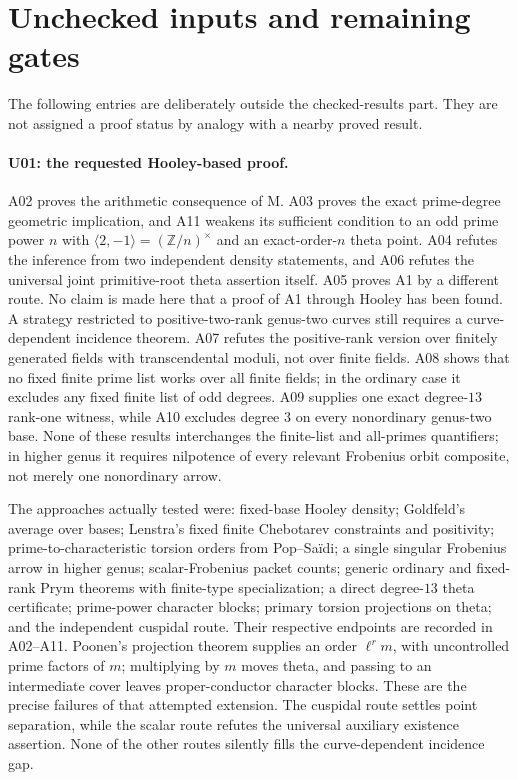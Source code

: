 \documentclass[11pt,a4paper]{article}
\begin{document}
\section{Unchecked inputs and remaining gates}
\label{sec:remaining}

The following entries are deliberately outside the checked-results
part. They are not assigned a proof status by analogy with a nearby
proved result.

\paragraph{U01: the requested Hooley-based proof.}
A02 proves the arithmetic consequence of M. A03 proves the exact
prime-degree geometric implication, and A11 weakens its sufficient
condition to an odd prime power $n$ with
$\langle2,-1\rangle=(\mathbb Z/n)^\times$ and an exact-order-$n$
theta point. A04 refutes the inference from
two independent density statements, and A06 refutes the universal
joint primitive-root theta assertion itself. A05 proves A1 by a
different route. No claim is made here that a proof of A1 through
Hooley has been found. A strategy restricted to positive-two-rank
genus-two curves still requires a curve-dependent incidence theorem.
A07 refutes the positive-rank version over finitely generated fields
with transcendental moduli, not over finite fields. A08 shows that
no fixed finite prime list works over all finite fields; in the
ordinary case it excludes any fixed finite list of odd degrees.
A09 supplies one exact degree-$13$ rank-one witness, while A10
excludes degree $3$ on every nonordinary genus-two base. None of
these results interchanges the finite-list and all-primes quantifiers;
in higher genus it requires nilpotence of every relevant Frobenius
orbit composite, not merely one nonordinary arrow.

The approaches actually tested were: fixed-base Hooley density;
Goldfeld's average over bases; Lenstra's fixed finite Chebotarev
constraints and positivity; prime-to-characteristic torsion orders
from Pop--Sa\"idi; a single singular Frobenius arrow in higher genus;
scalar-Frobenius packet counts; generic ordinary and fixed-rank
Prym theorems with finite-type specialization; a direct degree-$13$
theta certificate; prime-power character blocks; primary torsion
projections on theta; and the independent cuspidal route.
Their respective endpoints are recorded in A02--A11. Poonen's
projection theorem supplies an order $\ell^r m$, with uncontrolled
prime factors of $m$; multiplying by $m$ moves theta, and passing to
an intermediate cover leaves proper-conductor character blocks.
These are the precise failures of that attempted extension.
The cuspidal route
settles point separation, while the scalar route refutes the
universal auxiliary existence assertion. None of the other routes
silently fills the curve-dependent incidence gap.
\end{document}

